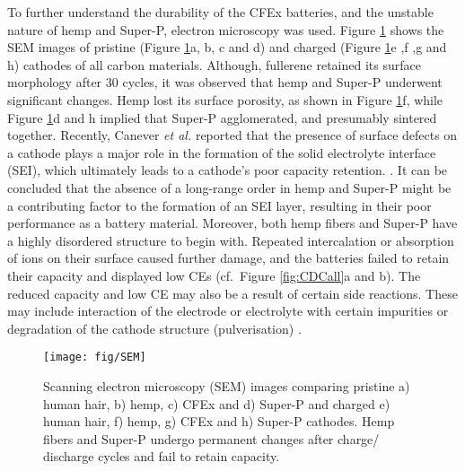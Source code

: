 \documentclass{article}
\begin{document}
To further understand the durability of the CFEx batteries, and the unstable nature of hemp and Super-P, electron microscopy was used. Figure \ref{fig:SEM} shows the SEM images of pristine (Figure \ref{fig:SEM}a, b, c and d) and charged (Figure \ref{fig:SEM}e ,f ,g and h) cathodes of all carbon materials. Although, fullerene retained its surface morphology after 30 cycles, it was observed that hemp and Super-P underwent significant changes. Hemp lost its surface porosity, as shown in Figure \ref{fig:SEM}f, while Figure \ref{fig:SEM}d and h implied that Super-P agglomerated, and presumably sintered together. Recently, Canever \textit{et al.} reported that the presence of surface defects on a cathode plays a major role in the formation of the solid electrolyte interface (SEI), which ultimately leads to a cathode's poor capacity retention. \cite{canever_solid-electrolyte_2020}. It can be concluded that the absence of a long-range order in hemp and Super-P might be a contributing factor to the formation of an SEI layer, resulting in their poor performance as a battery material. Moreover, both hemp fibers and Super-P have a highly disordered structure to begin with. Repeated intercalation or absorption of ions on their surface caused further damage, and the batteries failed to retain their capacity and displayed low CEs (cf.\ Figure \ref{fig:CDCall}a and b). The reduced capacity and low CE may also be a result of certain side reactions. These may include interaction of the electrode or electrolyte with certain impurities or degradation of the cathode structure (pulverisation) \cite{gyenes_understanding_2015}. 

\begin{figure}%
  \centering
  \texttt{[image: fig/SEM]}
    \caption{Scanning electron microscopy (SEM) images comparing pristine a) human hair, b) hemp, c) CFEx and d) Super-P and charged e) human hair, f) hemp, g) CFEx and h) Super-P cathodes. Hemp fibers and Super-P undergo permanent changes after charge/ discharge cycles and fail to retain capacity.}
  \label{fig:SEM}
\end{figure}
\end{document}
